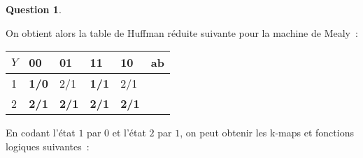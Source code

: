 \documentclass[11pt,a4paper,dvipsnames,]{article}
\theoremstyle{definition}%
\newtheorem{Q}{Question}[] %
\begin{document}
\begin{Q}
{\begin{enumerate}
		On obtient alors la table de Huffman réduite suivante pour la machine de Mealy~:

		\begin{center}
		\begin{tabular}{|l|l|l|l|l|l}
		\hline
		$Y$ & 00         & 01         & 11         & 10         & \multicolumn{1}{l|}{ab} \\ \hline
		1           & \textbf{1/0} & 2/1          & \textbf{1/1}          & 2/1          &  \\ \cline{1-5}
		2           & \textbf{2/1}          & \textbf{2/1} & \textbf{2/1} & \textbf{2/1} &  \\ \cline{1-5}
		\end{tabular}
		\end{center}

		En codant l'état $1$ par $0$ et l'état $2$ par $1$, on peut obtenir les k-maps et fonctions logiques suivantes~:
		\begin{center}

		\end{center}



	\end{enumerate}
}
\end{Q}
\end{document}
